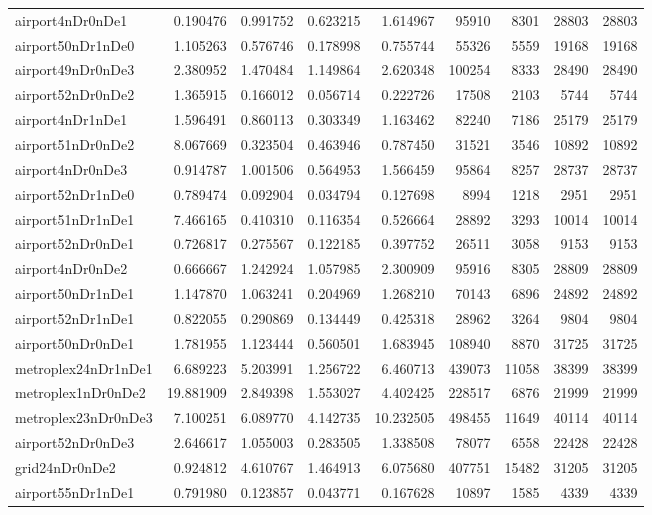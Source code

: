 \begin{longtable}{|l|r|r|r|r|r|r|r|r|}
airport4nDr0nDe1 & 0.190476 & 0.991752 & 0.623215 & 1.614967 & 95910 & 8301 & 28803 & 28803 \\
airport50nDr1nDe0 & 1.105263 & 0.576746 & 0.178998 & 0.755744 & 55326 & 5559 & 19168 & 19168 \\
airport49nDr0nDe3 & 2.380952 & 1.470484 & 1.149864 & 2.620348 & 100254 & 8333 & 28490 & 28490 \\
airport52nDr0nDe2 & 1.365915 & 0.166012 & 0.056714 & 0.222726 & 17508 & 2103 & 5744 & 5744 \\
airport4nDr1nDe1 & 1.596491 & 0.860113 & 0.303349 & 1.163462 & 82240 & 7186 & 25179 & 25179 \\
airport51nDr0nDe2 & 8.067669 & 0.323504 & 0.463946 & 0.787450 & 31521 & 3546 & 10892 & 10892 \\
airport4nDr0nDe3 & 0.914787 & 1.001506 & 0.564953 & 1.566459 & 95864 & 8257 & 28737 & 28737 \\
airport52nDr1nDe0 & 0.789474 & 0.092904 & 0.034794 & 0.127698 & 8994 & 1218 & 2951 & 2951 \\
airport51nDr1nDe1 & 7.466165 & 0.410310 & 0.116354 & 0.526664 & 28892 & 3293 & 10014 & 10014 \\
airport52nDr0nDe1 & 0.726817 & 0.275567 & 0.122185 & 0.397752 & 26511 & 3058 & 9153 & 9153 \\
airport4nDr0nDe2 & 0.666667 & 1.242924 & 1.057985 & 2.300909 & 95916 & 8305 & 28809 & 28809 \\
airport50nDr1nDe1 & 1.147870 & 1.063241 & 0.204969 & 1.268210 & 70143 & 6896 & 24892 & 24892 \\
airport52nDr1nDe1 & 0.822055 & 0.290869 & 0.134449 & 0.425318 & 28962 & 3264 & 9804 & 9804 \\
airport50nDr0nDe1 & 1.781955 & 1.123444 & 0.560501 & 1.683945 & 108940 & 8870 & 31725 & 31725 \\
metroplex24nDr1nDe1 & 6.689223 & 5.203991 & 1.256722 & 6.460713 & 439073 & 11058 & 38399 & 38399 \\
metroplex1nDr0nDe2 & 19.881909 & 2.849398 & 1.553027 & 4.402425 & 228517 & 6876 & 21999 & 21999 \\
metroplex23nDr0nDe3 & 7.100251 & 6.089770 & 4.142735 & 10.232505 & 498455 & 11649 & 40114 & 40114 \\
airport52nDr0nDe3 & 2.646617 & 1.055003 & 0.283505 & 1.338508 & 78077 & 6558 & 22428 & 22428 \\
grid24nDr0nDe2 & 0.924812 & 4.610767 & 1.464913 & 6.075680 & 407751 & 15482 & 31205 & 31205 \\
airport55nDr1nDe1 & 0.791980 & 0.123857 & 0.043771 & 0.167628 & 10897 & 1585 & 4339 & 4339 \\

\end{longtable}
